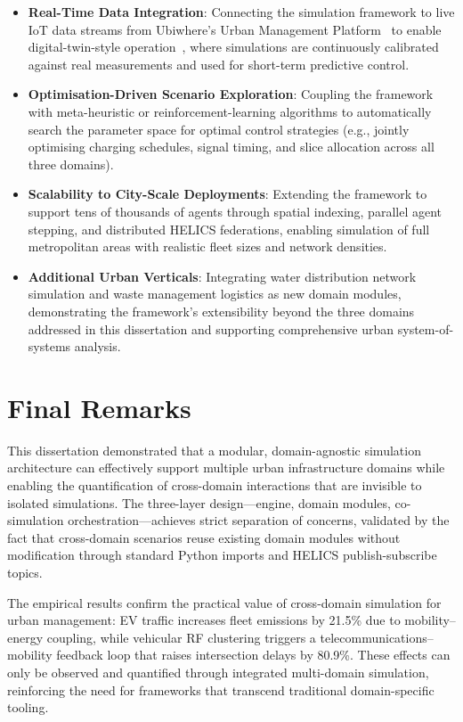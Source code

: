 \begin{itemize}
    \item \textbf{Real-Time Data Integration}: Connecting the simulation framework to live IoT data streams from Ubiwhere's Urban Management Platform~\cite{ubiwhere_urban_platform} to enable digital-twin-style operation~\cite{digital_twin_cities}, where simulations are continuously calibrated against real measurements and used for short-term predictive control.

    \item \textbf{Optimisation-Driven Scenario Exploration}: Coupling the framework with meta-heuristic or reinforcement-learning algorithms to automatically search the parameter space for optimal control strategies (e.g., jointly optimising charging schedules, signal timing, and slice allocation across all three domains).

    \item \textbf{Scalability to City-Scale Deployments}: Extending the framework to support tens of thousands of agents through spatial indexing, parallel agent stepping, and distributed HELICS federations, enabling simulation of full metropolitan areas with realistic fleet sizes and network densities.

    \item \textbf{Additional Urban Verticals}: Integrating water distribution network simulation and waste management logistics as new domain modules, demonstrating the framework's extensibility beyond the three domains addressed in this dissertation and supporting comprehensive urban system-of-systems analysis.
\end{itemize}


\section{Final Remarks}

This dissertation demonstrated that a modular, domain-agnostic simulation architecture can effectively support multiple urban infrastructure domains while enabling the quantification of cross-domain interactions that are invisible to isolated simulations. The three-layer design---engine, domain modules, co-simulation orchestration---achieves strict separation of concerns, validated by the fact that cross-domain scenarios reuse existing domain modules without modification through standard Python imports and HELICS publish-subscribe topics.

The empirical results confirm the practical value of cross-domain simulation for urban management: EV traffic increases fleet emissions by 21.5\% due to mobility--energy coupling, while vehicular RF clustering triggers a telecommunications--mobility feedback loop that raises intersection delays by 80.9\%. These effects can only be observed and quantified through integrated multi-domain simulation, reinforcing the need for frameworks that transcend traditional domain-specific tooling.

